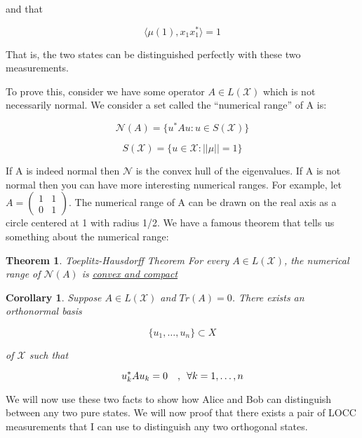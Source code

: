\documentclass{article}
\newtheorem{theorem}{Theorem}
\newtheorem{corollary}{Corollary}[theorem]
\begin{document}
and that

\[ 
    \langle \mu(1) , x_1 x_1^* \rangle = 1
\]

That is, the two states can be distinguished perfectly with these two
measurements.

To prove this, consider we have some operator $A \in L(\mathcal{X})$ which is
not necessarily normal. We consider a set called the ``numerical range'' of A
is:

\[ 
    \mathcal{N}(A) = \{u^*Au : u \in S(\mathcal{X}) \}
\]

\[ 
    S(\mathcal{X}) = \{u \in \mathcal{X}: \left| \left| \mu \right| \right| = 1
    \}
\]

If A is indeed normal then $\mathcal{N}$ is the convex hull of the eigenvalues.
If A is not normal then you can have more interesting numerical ranges. For
example, let $A = \begin{pmatrix} 1 & 1 \\ 0 & 1 \end{pmatrix}$. The numerical
range of A can be drawn on the real axis as a circle centered at 1 with radius
1/2. We have a famous theorem that tells us something about the numerical range:

\begin{theorem}{Toeplitz-Hausdorff Theorem}
    For every $A \in L(\mathcal{X})$, the numerical range of $\mathcal{N}(A)$ is
    \underline{convex and compact}
\end{theorem}
\begin{corollary}
    Suppose $A\in L(\mathcal{X})$ and $Tr(A) = 0$. There exists an orthonormal
    basis

    \[ 
        \{u_1,\ldots,u_n\} \subset X 
    \]

    of $\mathcal{X}$ such that

    \[ 
        u_k^* A u_k = 0 \quad,\enskip \forall k=1,\ldots,n 
    \]

\end{corollary}
We will now use these two facts to show how Alice and Bob can distinguish
between any two pure states. We will now proof that there exists a pair of LOCC
measurements that I can use to distinguish any two orthogonal states.
\end{document}
